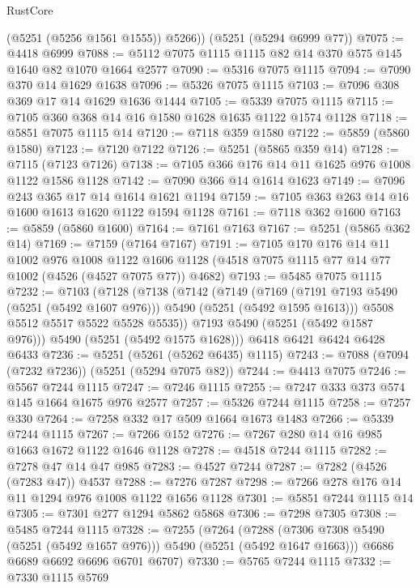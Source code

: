 \begin{lexlean}{RustCore}
\begin{coremodule}
        (@5251 (@5256 @1561 @1555))
        @5266))
    (@5251 (@5294 @6999 @77))
@7075 := @4418 @6999
@7088 := @5112 @7075 @1115 @1115 @82 @14 @370 @575 @145 @1640 @82 @1070 @1664 @2577
@7090 := @5316 @7075 @1115
@7094 := @7090 @370 @14 @1629 @1638
@7096 := @5326 @7075 @1115
@7103 := @7096 @308 @369 @17 @14 @1629 @1636 @1444
@7105 := @5339 @7075 @1115
@7115 := @7105 @360 @368 @14 @16 @1580 @1628 @1635 @1122 @1574 @1128
@7118 := @5851 @7075 @1115 @14
@7120 := @7118 @359 @1580
@7122 := @5859 (@5860 @1580)
@7123 := @7120 @7122
@7126 := @5251 (@5865 @359 @14)
@7128 := @7115 (@7123 @7126)
@7138 := @7105 @366 @176 @14 @11 @1625 @976 @1008 @1122 @1586 @1128
@7142 := @7090 @366 @14 @1614 @1623
@7149 := @7096 @243 @365 @17 @14 @1614 @1621 @1194
@7159 := @7105 @363 @263 @14 @16 @1600 @1613 @1620 @1122 @1594 @1128
@7161 := @7118 @362 @1600
@7163 := @5859 (@5860 @1600)
@7164 := @7161 @7163
@7167 := @5251 (@5865 @362 @14)
@7169 := @7159 (@7164 @7167)
@7191 := @7105
    @170
    @176
    @14
    @11
    @1002
    @976
    @1008
    @1122
    @1606
    @1128
    (@4518 @7075 @1115 @77 @14 @77 @1002 (@4526 (@4527 @7075 @77)) @4682)
@7193 := @5485 @7075 @1115
@7232 := @7103
    (@7128
      (@7138
        (@7142
          (@7149
            (@7169 (@7191 @7193 @5490 (@5251 (@5492 @1607 @976))) @5490 (@5251 (@5492 @1595 @1613)))
            @5508
            @5512
            @5517
            @5522
            @5528
            @5535))
        @7193
        @5490
        (@5251 (@5492 @1587 @976)))
      @5490
      (@5251 (@5492 @1575 @1628)))
    @6418
    @6421
    @6424
    @6428
    @6433
@7236 := @5251 (@5261 (@5262 @6435) @1115)
@7243 := @7088 (@7094 (@7232 @7236)) (@5251 (@5294 @7075 @82))
@7244 := @4413 @7075
@7246 := @5567 @7244 @1115
@7247 := @7246 @1115
@7255 := @7247 @333 @373 @574 @145 @1664 @1675 @976 @2577
@7257 := @5326 @7244 @1115
@7258 := @7257 @330
@7264 := @7258 @332 @17 @509 @1664 @1673 @1483
@7266 := @5339 @7244 @1115
@7267 := @7266 @152
@7276 := @7267 @280 @14 @16 @985 @1663 @1672 @1122 @1646 @1128
@7278 := @4518 @7244 @1115
@7282 := @7278 @47 @14 @47 @985
@7283 := @4527 @7244
@7287 := @7282 (@4526 (@7283 @47)) @4537
@7288 := @7276 @7287
@7298 := @7266 @278 @176 @14 @11 @1294 @976 @1008 @1122 @1656 @1128
@7301 := @5851 @7244 @1115 @14
@7305 := @7301 @277 @1294 @5862 @5868
@7306 := @7298 @7305
@7308 := @5485 @7244 @1115
@7328 := @7255
    (@7264
      (@7288 (@7306 @7308 @5490 (@5251 (@5492 @1657 @976))) @5490 (@5251 (@5492 @1647 @1663)))
      @6686
      @6689
      @6692
      @6696
      @6701
      @6707)
@7330 := @5765 @7244 @1115
@7332 := @7330 @1115 @5769

\end{coremodule}
\end{lexlean}
